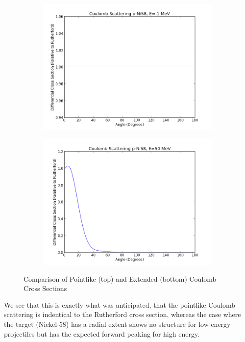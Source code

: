 \documentclass[paper=a4, fontsize=11pt]{scrartcl} %
\numberwithin{equation}{section} %
\numberwithin{figure}{section} %
\numberwithin{table}{section} %
\begin{document}
\begin{figure}[hbt]
        \begin{subfigure}[b]{0.35\textwidth}
                \includegraphics[width=\textwidth]{Coulombpoint1.png}
        \end{subfigure}
\quad
        \begin{subfigure}[b]{0.35\textwidth}
                \includegraphics[width=\textwidth]{Coulomb50.png}
        \end{subfigure}

        \caption{Comparison of Pointlike (top) and Extended (bottom) Coulomb Cross Sections }
\end{figure}

We see that this is exactly what was anticipated, that the pointlike Coulomb scattering is indentical to the Rutherford cross section, whereas the case where the target (Nickel-58) has a radial extent shows no structure for low-energy projectiles but has the expected forward peaking for high energy. \\
\end{document}
